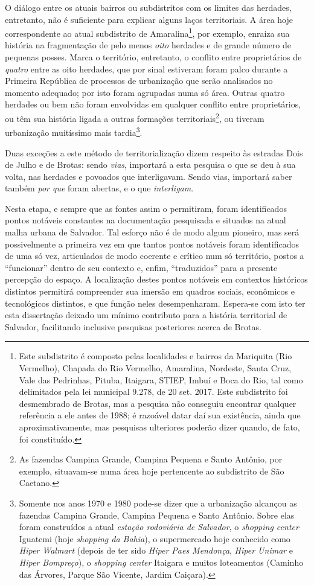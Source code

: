 O diálogo entre os atuais bairros ou subdistritos com os limites das herdades, entretanto, não é suficiente para explicar alguns laços territoriais. A área hoje correspondente ao atual subdistrito de Amaralina\footnote{Este subdistrito é composto pelas localidades e bairros da Mariquita (Rio Vermelho), Chapada do Rio Vermelho, Amaralina, Nordeste, Santa Cruz, Vale das Pedrinhas, Pituba, Itaigara, STIEP, Imbuí e Boca do Rio, tal como delimitados pela lei municipal 9.278, de 20 set. 2017. Este subdistrito foi desmembrado de Brotas, mas a pesquisa não conseguiu encontrar qualquer referência a ele antes de 1988; é razoável datar daí sua existência, ainda que aproximativamente, mas pesquisas ulteriores poderão dizer quando, de fato, foi constituído.}, por exemplo, enraiza sua história na fragmentação de pelo menos \textit{oito} herdades e de grande número de pequenas posses. Marca o território, entretanto, o conflito entre proprietários de \textit{quatro} entre as oito herdades, que por sinal estiveram foram palco durante a Primeira República de processos de urbanização que serão analisados no momento adequado; por isto foram agrupadas numa só área. Outras quatro herdades ou bem não foram envolvidas em qualquer conflito entre proprietários, ou têm sua história ligada a outras formações territoriais\footnote{As fazendas Campina Grande, Campina Pequena e Santo Antônio, por exemplo, situavam-se numa área hoje pertencente ao subdistrito de São Caetano.}, ou tiveram urbanização muitíssimo mais tardia\footnote{Somente nos anos 1970 e 1980 pode-se dizer que a urbanização alcançou as fazendas Campina Grande, Campina Pequena e Santo Antônio. Sobre elas foram construídos a atual \textit{estação rodoviária de Salvador}, o \textit{shopping center} Iguatemi (hoje \textit{shopping da Bahia}), o supermercado hoje conhecido como \textit{Hiper Walmart} (depois de ter sido \textit{Hiper Paes Mendonça}, \textit{Hiper Unimar} e \textit{Hiper Bompreço}), o \textit{shopping center} Itaigara e muitos loteamentos (Caminho das Árvores, Parque São Vicente, Jardim Caiçara).}.

Duas exceções a este método de territorialização dizem respeito às estradas Dois de Julho e de Brotas: sendo \textit{vias}, importará a esta pesquisa o que se deu à sua volta, nas herdades e povoados que interligavam. Sendo vias, importará saber também \textit{por que} foram abertas, e o que \textit{interligam}.

Nesta etapa, e sempre que as fontes assim o permitiram, foram identificados pontos notáveis constantes na documentação pesquisada e situados na atual malha urbana de Salvador. Tal esforço não é de modo algum pioneiro, mas será possivelmente a primeira vez em que tantos pontos notáveis foram identificados de uma só vez, articulados de modo coerente e crítico num só território, postos a ``funcionar'' dentro de seu contexto e, enfim, ``traduzidos'' para a presente percepção do espaço. A localização destes pontos notáveis em contextos históricos distintos permitirá compreender sua imersão em quadros sociais, econômicos e tecnológicos distintos, e que função neles desempenharam. Espera-se com isto ter esta dissertação deixado um mínimo contributo para a história territorial de Salvador, facilitando inclusive pesquisas posteriores acerca de Brotas. 

